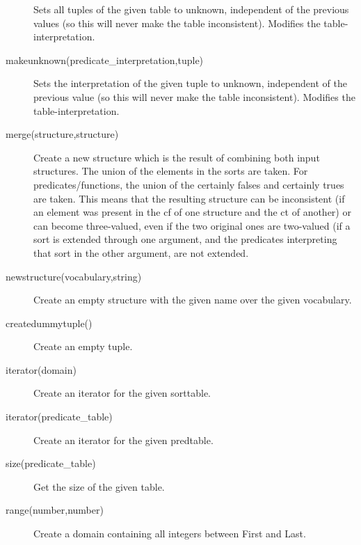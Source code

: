 \begin{description}
 		Sets all tuples of the given table to unknown, independent of the previous values (so this will never make the table inconsistent).
 		Modifies the table-interpretation.
	\item[makeunknown(predicate\_interpretation,tuple)]
 		Sets the interpretation of the given tuple to unknown, independent of the previous value (so this will never make the table inconsistent).
 		Modifies the table-interpretation.
	\item[merge(structure,structure)]
 		Create a new structure which is the result of combining both input structures. The union of the elements in the sorts are taken. For predicates/functions, 
 		the union of the certainly falses and certainly trues are taken. This means that the resulting structure can be inconsistent (if an element was present in the cf
 		of one structure and the ct of another) or can become three-valued, even if the two original ones are two-valued (if a sort is extended through one argument, and 
 		the predicates interpreting that sort in the other argument, are not extended.
	\item[newstructure(vocabulary,string)]
 		Create an empty structure with the given name over the given vocabulary.
 		
 	\item[createdummytuple()]
		Create an empty tuple.
	
	\item[iterator(domain)]
 		Create an iterator for the given sorttable.
	\item[iterator(predicate\_table)]
 		Create an iterator for the given predtable.
	\item[size(predicate\_table)]
 		Get the size of the given table.
 		
 	\item[range(number,number)]
 		Create a domain containing all integers between First and Last.
\end{description}


